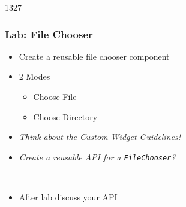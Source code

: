 \begin{slide}{1327}\frametitle{Lab: File Chooser}
 \begin{itemize}
  \item Create a reusable file chooser component
  \item 2 Modes
    \begin{itemize}
    \item Choose File
    \item Choose Directory
    \end{itemize}
  \item \textit{Think about the Custom Widget Guidelines!}
  \item \textit{Create a reusable API for a
      \texttt{FileChooser}?}
 \end{itemize}
  \\
 \begin{itemize}
 \item After lab discuss your API
 \end{itemize}
\end{slide}


